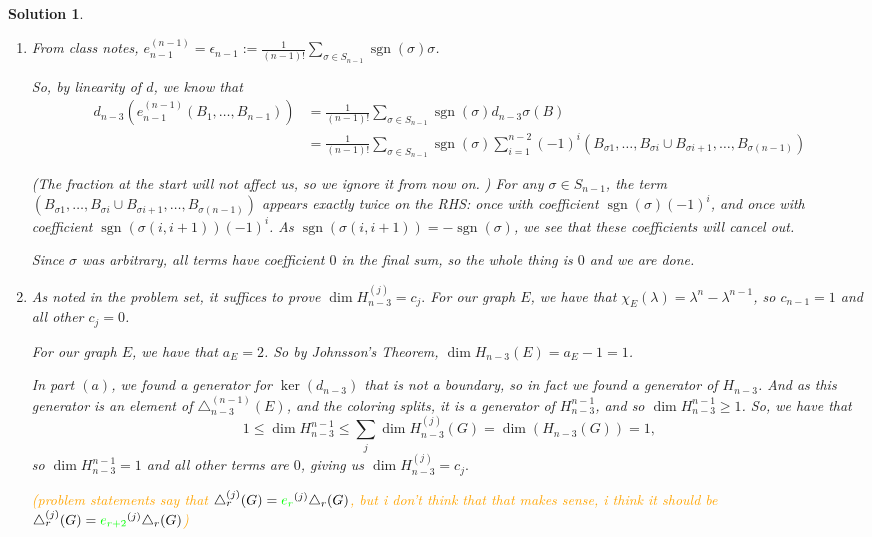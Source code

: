 \documentclass{article}
\def\sgn{\operatorname{sgn}}
\def\tco{\textcolor{orange}}
\def\tcg{\textcolor{green}}
\theoremstyle{normal}
\theoremstyle{thmit}
\newtheorem*{solution}{Solution}
\begin{document}
\begin{solution}
\begin{enumerate}[label = (\alph*)]
    \item 
    From class notes,
    $e_{n-1}^{(n-1)}=\epsilon_{n-1}:=\frac{1}{(n-1)!}\sum_{\sigma\in S_{n-1}}\sgn(\sigma)\sigma$. 

So, by linearity of $d$, we know that 
\begin{align*}
    d_{n-3}(e_{n-1}^{(n-1)}(B_1, \dots, B_{n-1}))
    &=\frac{1}{(n-1)!}\sum_{\sigma\in S_{n-1}}\sgn(\sigma)d_{n-3}\sigma(B)\\
    &=\frac{1}{(n-1)!}\sum_{\sigma\in S_{n-1}}\sgn(\sigma)
    \sum_{i=1}^{n-2}(-1)^i(B_{\sigma 1},\dots, B_{\sigma i}\cup B_{\sigma {i+1}},\dots,B_{\sigma(n-1)})
\end{align*}

(The fraction at the start will not affect us, so we ignore it from now on. )
For any $\sigma \in S_{n-1}$, the term $ (B_{\sigma 1}, \dots, B_{\sigma i} \cup B_{\sigma {i+1}}, \dots, B_{\sigma(n-1)})$ appears exactly twice on the RHS: once with coefficient $\sgn(\sigma)(-1)^i$, and once with coefficient $\sgn(\sigma (i, i+1)) (-1)^i$. As $\sgn(\sigma (i, i+1))=-\sgn(\sigma)$, we see that these coefficients will cancel out.

Since $\sigma$ was arbitrary, all terms have coefficient $0$ in the final sum, so the whole thing is $0$ and we are done. 

\item As noted in the problem set, it suffices to prove $\dim H_{n-3}^{(j)}=c_j.$ For our graph $E$, we have that $\chi_E(\lambda) = \lambda^n - \lambda^{n-1}$, so $c_{n-1}=1$ and all other $c_j=0$. 

For our graph $E$, we have that $a_E=2$. So 
by Johnsson's Theorem, $\dim H_{n-3}(E)= a_E -1 = 1$. %

In part $(a)$, we found a generator for $\ker(d_{n-3})$ that is not a boundary, so in fact we found a generator of $H_{n-3}$. And as this generator is an element of  $\triangle_{n-3}^{(n-1)}(E)$, and the coloring splits, it is a generator of $H_{n-3}^{n-1}$, and so $\dim H_{n-3}^{n-1} \geq 1$.
So, we have that 
\[1 \leq \dim H_{n-3}^{n-1} \leq \sum_{j} \dim H_{n-3}^{(j)}(G) =  \dim (H_{n-3}(G)) = 1,\]
so $\dim H_{n-3}^{n-1} = 1$ and all other terms are $0$, giving us $\dim H_{n-3}^{(j)}=c_j.$

\tco{(problem statements say that $\triangle_r^{(j)}(G) = \tcg{e_r}^{(j)} \triangle_r (G)$, but i don't think that that makes sense, i think it should be $\triangle_r^{(j)}(G) = \tcg{e_{r+2}}^{(j)} \triangle_r (G)$)}

\end{enumerate}

\end{solution}
\end{document}

